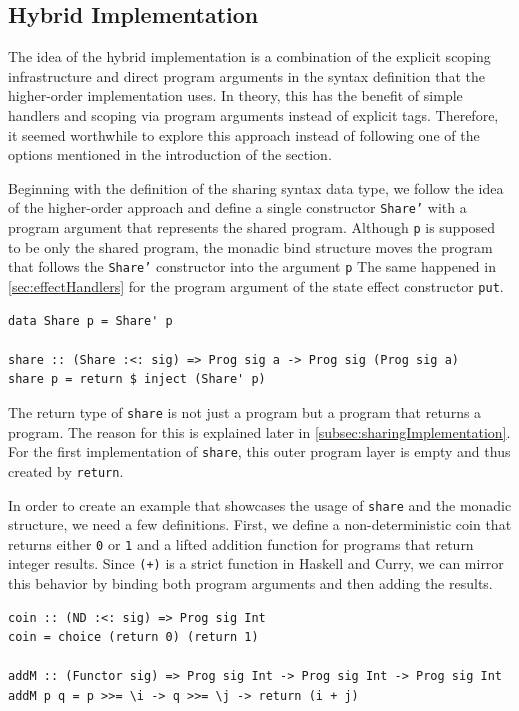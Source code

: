 \documentclass[a4paper, 11pt, fleqn, twoside]{scrreprt}
\newcommand{\hinl}[1]{\texttt{#1}}
\begin{document}
\subsection{Hybrid Implementation}

The idea of the hybrid implementation is a combination of the explicit scoping infrastructure and direct program arguments in the syntax definition that the higher-order implementation uses.
In theory, this has the benefit of simple handlers and scoping via program arguments instead of explicit tags.
Therefore, it seemed worthwhile to explore this approach instead of following one of the options mentioned in the introduction of the section.

Beginning with the definition of the sharing syntax data type, we follow the idea of the higher-order approach and define a single constructor \hinl{Share'} with a program argument that represents the shared program.
Although \hinl{p} is supposed to be only the shared program, the monadic bind structure moves the program that follows the \hinl{Share'} constructor into the argument \hinl{p}
The same happened in \autoref{sec:effectHandlers} for the program argument of the state effect constructor \hinl{put}.

\begin{verbatim}
data Share p = Share' p

share :: (Share :<: sig) => Prog sig a -> Prog sig (Prog sig a)
share p = return $ inject (Share' p)
\end{verbatim}

The return type of \hinl{share} is not just a program but a program that returns a program.
The reason for this is explained later in \autoref{subsec:sharingImplementation}.
For the first implementation of \hinl{share}, this outer program layer is empty and thus created by \hinl{return}.

In order to create an example that showcases the usage of \hinl{share} and the monadic structure, we need a few definitions.
First, we define a non-deterministic coin that returns either \hinl{0} or \hinl{1} and a lifted addition function for programs that return integer results.
Since \hinl{(+)} is a strict function in Haskell and Curry, we can mirror this behavior by binding both program arguments and then adding the results.

\begin{verbatim}
coin :: (ND :<: sig) => Prog sig Int
coin = choice (return 0) (return 1)

addM :: (Functor sig) => Prog sig Int -> Prog sig Int -> Prog sig Int
addM p q = p >>= \i -> q >>= \j -> return (i + j)
\end{verbatim}
\end{document}
